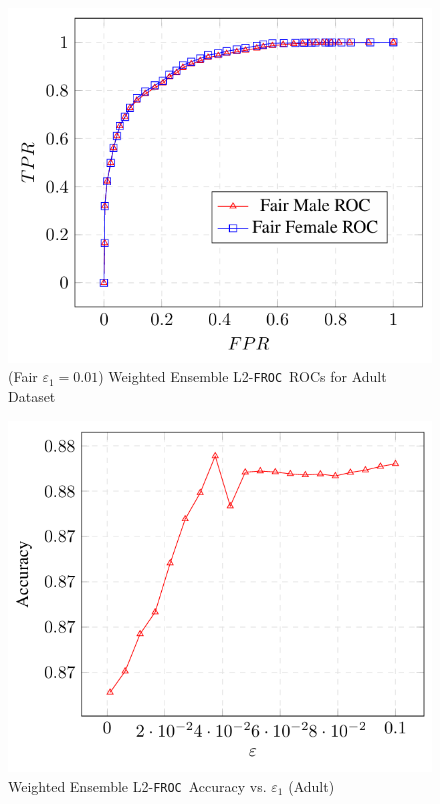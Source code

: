 \documentclass{article}
\newcommand{\ouralgo}{\texttt{FROC}}
\begin{document}
\begin{figure}[!h]
    \centering
    \includegraphics[width=1\linewidth]{Images/WEL2_Adult_ROC_FROC.png}
    \caption{(Fair $\varepsilon_1 = 0.01$) Weighted Ensemble L2-\ouralgo\   ROCs for Adult Dataset}
    \label{fig:WEL2_Adult_ROC_FROC}
\end{figure}

\begin{figure}[!h]
    \centering
    \includegraphics[width=1\linewidth]{Images/WEL2_Adult_Accuracy.png}
    \caption{Weighted Ensemble L2-\ouralgo\  Accuracy vs. $\varepsilon_1$ (Adult)}
    \label{fig:WEL2_Adult_Accuracy}
\end{figure}
\end{document}
